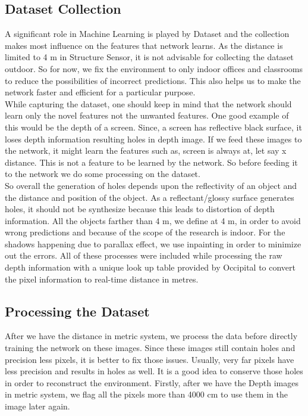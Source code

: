 \subsection{Dataset Collection}

A significant role in Machine Learning is played by Dataset and the collection makes most influence on the features that network learns. As the distance is limited to 4 m in Structure Sensor, it is not advisable for collecting the dataset outdoor. So for now, we fix the environment to only indoor offices and classrooms to reduce the possibilities of incorrect predictions. This also helps us to make the network faster and efficient for a particular purpose. \\

While capturing the dataset, one should keep in mind that the network should learn only the novel features not the unwanted features. One good example of this would be the depth of a screen. Since, a screen has reflective black surface, it loses depth information resulting holes in depth image. If we feed these images to the network, it might learn the features such as, screen is always at, let say x distance. This is not a feature to be learned by the network. So before feeding it to the network we do some processing on the dataset.\\

So overall the generation of holes depends upon the reflectivity of an object and the distance and position of the object. As a reflectant/glossy surface generates holes, it should not be synthesize because this leads to distortion of depth information.  All the objects farther than 4 m, we define at 4 m, in order to avoid wrong predictions and because of the scope of the research is indoor. For the shadows happening due to parallax effect, we use inpainting in order to minimize out the errors. All of these processes were included while processing the raw depth information with a unique look up table provided by Occipital to convert the pixel information to real-time distance in metres.\\

\subsection{Processing the Dataset}

After we have the distance in metric system, we process the data before directly training the network on these images. Since these images still contain holes and precision less pixels, it is better to fix those issues. Usually, very far pixels have less precision and results in holes as well. It is a good idea to conserve those holes in order to reconstruct the environment. Firstly, after we have the Depth images in metric system, we flag all the pixels more than 4000 cm to use them in the image later again.

